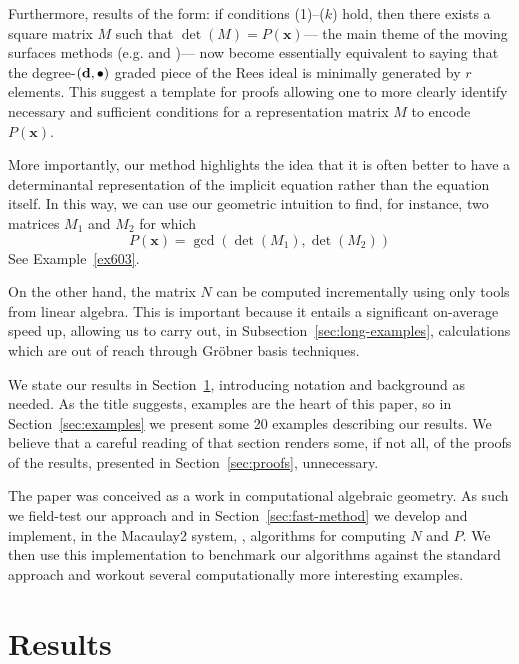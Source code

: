 \documentclass[fleqn,reqno]{amsart}
\begin{document}
\begin{paragraf*}
Furthermore, results of the form:
if conditions (1)--($k$) hold,
then there exists a square matrix $M$ such that $\det(M)=P(\mathbf x)$---%
the main theme of the moving surfaces methods (e.g. \citet{BCD-03} and \citet{AHW-05})---%
now become essentially equivalent to saying that the degree-$(\mathbf d,\bullet)$ graded piece
of the Rees ideal is minimally generated by $r$ elements.
This suggest a template for proofs allowing one to more clearly
identify necessary and sufficient conditions for a representation matrix $M$
to encode $P(\mathbf x)$.

More importantly, our method highlights the idea that
it is often better to have a determinantal representation of the implicit equation
rather than the equation itself.
In this way, we can use our geometric intuition to find, for instance,
two matrices $M_1$ and $M_2$ for which
\[
	P(\mathbf x)=\gcd(\det(M_1),\det(M_2))
\]
See Example~\ref{ex603}.

On the other hand,
the matrix $N$ can be computed incrementally using only tools from linear algebra.
This is important because it entails a significant on-average speed up,
allowing us to carry out,
in Subsection~\ref{sec:long-examples},
calculations which are out of reach through Gr\"obner basis techniques. 
\end{paragraf*}

\begin{paragraf*}
We state our results in Section~\ref{sec:results},
introducing notation and background as needed.
As the title suggests,
examples are the heart of this paper,
so in Section~\ref{sec:examples} we present some 20 examples describing our results.
We believe that a careful reading of that section renders some, if not all,
of the proofs of the results, presented in Section~\ref{sec:proofs}, unnecessary.

The paper was conceived as a work in computational algebraic geometry.
As such we field-test our approach and in Section~\ref{sec:fast-method}
we develop and implement, in the Macaulay2 system, \citet{M2},
algorithms for computing $N$ and $P$.
We then use this implementation to benchmark our algorithms against the standard approach
and workout several computationally more interesting examples.
\end{paragraf*}





\section{Results}
\label{sec:results}
\end{document}
